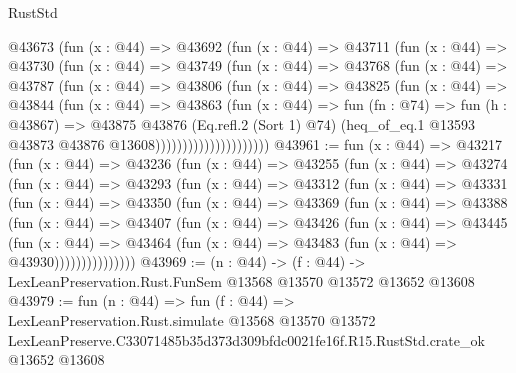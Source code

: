 \begin{lexlean}{RustStd}
\begin{coremodule}
                    @43673
                      (fun (x : @44) =>
                      @43692
                        (fun (x : @44) =>
                        @43711
                          (fun (x : @44) =>
                          @43730
                            (fun (x : @44) =>
                            @43749
                              (fun (x : @44) =>
                              @43768
                                (fun (x : @44) =>
                                @43787
                                  (fun (x : @44) =>
                                  @43806
                                    (fun (x : @44) =>
                                    @43825
                                      (fun (x : @44) =>
                                      @43844
                                        (fun (x : @44) =>
                                        @43863
                                          (fun (x : @44) =>
                                          fun (fn : @74) =>
                                          fun (h : @43867) =>
                                          @43875
                                            @43876
                                            (Eq.refl.{2} (Sort 1) @74)
                                            (heq_of_eq.{1}
                                              @13593
                                              @43873
                                              @43876
                                              @13608)))))))))))))))))))))
@43961 := fun (x : @44) =>
  @43217
    (fun (x : @44) =>
    @43236
      (fun (x : @44) =>
      @43255
        (fun (x : @44) =>
        @43274
          (fun (x : @44) =>
          @43293
            (fun (x : @44) =>
            @43312
              (fun (x : @44) =>
              @43331
                (fun (x : @44) =>
                @43350
                  (fun (x : @44) =>
                  @43369
                    (fun (x : @44) =>
                    @43388
                      (fun (x : @44) =>
                      @43407
                        (fun (x : @44) =>
                        @43426
                          (fun (x : @44) =>
                          @43445
                            (fun (x : @44) =>
                            @43464 (fun (x : @44) => @43483 (fun (x : @44) => @43930)))))))))))))))
@43969 := (n : @44) ->
  (f : @44) -> LexLeanPreservation.Rust.FunSem @13568 @13570 @13572 @13652 @13608
@43979 := fun (n : @44) =>
  fun (f : @44) =>
  LexLeanPreservation.Rust.simulate
    @13568
    @13570
    @13572
    LexLeanPreserve.C33071485b35d373d309bfdc0021fe16f.R15.RustStd.crate_ok
    @13652
    @13608
\end{coremodule}
\end{lexlean}
